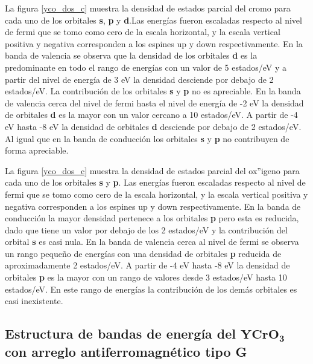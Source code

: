  \noindent La figura \ref{yco_dos_c}  muestra la densidad de 
 estados parcial del 
 cromo para 
 cada 
 uno de los orbitales \textbf{s}, \textbf{p} y \textbf{d}.Las 
 energ\'ias fueron escaladas 
 respecto al 
 nivel de fermi que se tomo como cero de la escala horizontal, y la 
 escala 
 vertical positiva y negativa corresponden a los espines up y down 
 respectivamente. En la banda de valencia se observa que la densidad 
 de los orbitales \textbf{d} es la predominante en todo el rango de 
 energ\'ias con un valor de 5 estados/eV y a partir del nivel de 
 energ\'ia de 3 eV la densidad desciende por debajo de 2 estados/eV. 
 La contribuci\'on de los orbitales \textbf{s} y \textbf{p} no es 
 apreciable. En la banda de valencia cerca del nivel de fermi hasta el 
 nivel de energ\'ia de -2 eV la densidad de orbitales  \textbf{d} es 
 la mayor con un valor cercano a 10 estados/eV. A partir de -4 eV 
 hasta -8 eV la densidad de orbitales \textbf{d} desciende por debajo 
 de 2 estados/eV. Al igual que en la banda de conducci\'on los 
 orbitales \textbf{s} y \textbf{p} no contribuyen de forma apreciable.
 
 
\noindent La figura \ref{yco_dos_c}  muestra la densidad de 
estados parcial del 
 ox''igeno para 
 cada 
 uno de los orbitales \textbf{s} y \textbf{p}. Las 
 energ\'ias fueron escaladas 
 respecto al 
 nivel de fermi que se tomo como cero de la escala horizontal, y la 
 escala 
 vertical positiva y negativa corresponden a los espines up y down 
 respectivamente. En la banda de conducci\'on la mayor densidad 
 pertenece a los orbitales \textbf{p} pero esta es reducida, dado que 
 tiene un valor por debajo de los 2 estados/eV y la contribuci\'on del 
 orbital \textbf{s} es casi nula. En la banda de valencia cerca al 
 nivel de fermi se observa un rango peque\~no de energ\'ias con una 
 densidad de orbitales \textbf{p} reducida de aproximadamente 2 
 estados/eV. A partir de -4 eV hasta -8 eV la densidad de orbitales 
 \textbf{p} es la mayor con un rango de valores desde 3 estados/eV 
 hasta 10 estados/eV. En este rango de energ\'ias la contribuci\'on de 
 los dem\'as orbitales es casi inexistente.
 

\subsection{Estructura de bandas de energ\'ia del $\mathbf{YCrO_{3}}$ con      
    arreglo antiferromagn\'etico tipo G}

